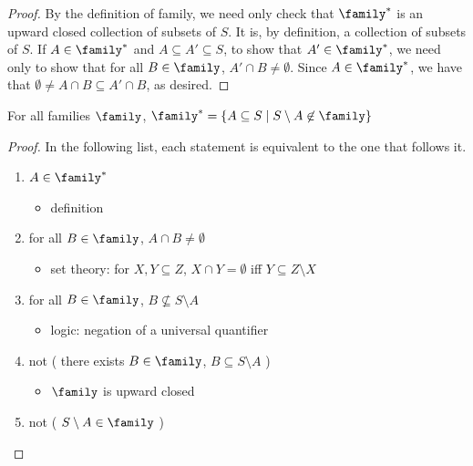 \begin{proof}
    By the definition of family, we need only check that $\family^*$ is an upward closed collection of subsets of $S$.  It is, by definition, a collection of subsets of $S$.  If $A \in \family^*$ and $A \subseteq A' \subseteq S$, to show that $A' \in \family^*$, we need only to show that for all $B \in \family$, $A' \cap B \neq \emptyset$.  Since $A \in \family^*$, we have that $\emptyset \neq A \cap B \subseteq A' \cap B$, as desired.
\end{proof}

\begin{theorem}
    \label{thm_equiv_fam_dual_formulation}
    \leanok{}
    For all families $\family$, $\family^* = \{A \subseteq S \mid S \setminus A \not\in \family\}$
\end{theorem}

\begin{proof}
\leanok{}
In the following list, each statement is equivalent to the one that follows it.
    \begin{enumerate}
        \item $A \in \family^*$
        \begin{itemize}
            \item[--] definition
        \end{itemize}
        \item for all $B \in \family$, $A \cap B \neq \emptyset$
        \begin{itemize}
            \item[--] set theory: for $X, Y \subseteq Z$, $X \cap Y = \emptyset$ iff $Y \subseteq Z \setminus X$
        \end{itemize}
        \item for all $B \in \family$, $B \not\subseteq S \setminus A$
        \begin{itemize}
            \item[--] logic: negation of a universal quantifier
        \end{itemize}
        \item not ( there exists $B \in \family$, $B \subseteq S \setminus A$ )
        \begin{itemize}
            \item[--] $\family$ is upward closed
        \end{itemize}
        \item not ( $S \setminus A \in \family$ )
    \end{enumerate}
\end{proof}

